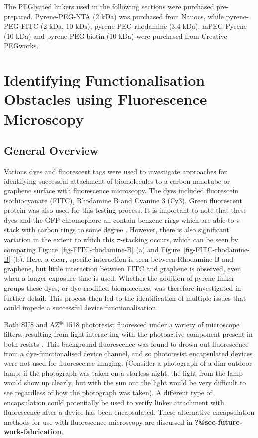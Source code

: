 \documentclass[
  a4paper,
]{scrbook}
\begin{document}
The PEGlyated linkers used in the following sections were purchased
pre-prepared. Pyrene-PEG-NTA (2 kDa) was purchased from Nanocs, while
pyrene-PEG-FITC (2 kDa, 10 kDa), pyrene-PEG-rhodamine (3.4 kDa),
mPEG-Pyrene (10 kDa) and pyrene-PEG-biotin (10 kDa) were purchased from
Creative PEGworks.

\hypertarget{sec-impediments}{%
\section{Identifying Functionalisation Obstacles using Fluorescence
Microscopy}\label{sec-impediments}}

\hypertarget{sec-fluorescence-remarks}{%
\subsection{General Overview}\label{sec-fluorescence-remarks}}

Various dyes and fluorescent tags were used to investigate approaches
for identifying successful attachment of biomolecules to a carbon
nanotube or graphene surface with fluorescence microscopy. The dyes
included fluorescein isothiocyanate (FITC), Rhodamine B and Cyanine 3
(Cy3). Green fluorescent protein was also used for this testing process.
It is important to note that these dyes and the GFP chromophore all
contain benzene rings which are able to \(\pi\)-stack with carbon rings
to some degree
\autocite{Nakayama-Ratchford2007,Tang2012,Khrenova2019,Qiu2019}.
However, there is also significant variation in the extent to which this
\(\pi\)-stacking occurs, which can be seen by comparing
Figure~\ref{fig-FITC-rhodamine-B} (a) and
Figure~\ref{fig-FITC-rhodamine-B} (b). Here, a clear, specific
interaction is seen between Rhodamine B and graphene, but little
interaction between FITC and graphene is observed, even when a longer
exposure time is used. Whether the addition of pyrene linker groups
these dyes, or dye-modified biomolecules, was therefore investigated in
further detail. This process then led to the identification of multiple
issues that could impede a successful device functionalisation.

Both SU8 and AZ\(^\circledR\) 1518 photoresist fluoresced under a
variety of microscope filters, resulting from light interacting with the
photoactive component present in both resists \autocite{Pai2007}. This
background fluorescence was found to drown out fluorescence from a
dye-functionalised device channel, and so photoresist encapsulated
devices were not used for fluorescence imaging. (Consider a photograph
of a dim outdoor lamp; if the photograph was taken on a starless night,
the light from the lamp would show up clearly, but with the sun out the
light would be very difficult to see regardless of how the photograph
was taken). A different type of encapsulation could potentially be used
to verify linker attachment with fluorescence after a device has been
encapsulated. These alternative encapsulation methods for use with
fluorescence microscopy are discussed in
\textbf{?@sec-future-work-fabrication}.
\end{document}
